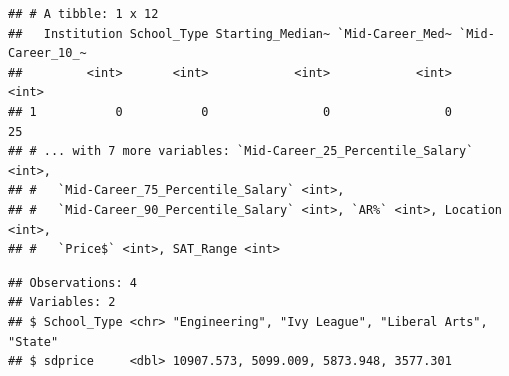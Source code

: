 \documentclass[]{article}
\newenvironment{Shaded}{\begin{snugshade}}{\end{snugshade}}
\newcommand{\KeywordTok}[1]{\textcolor[rgb]{0.13,0.29,0.53}{\textbf{#1}}}
\newcommand{\DataTypeTok}[1]{\textcolor[rgb]{0.13,0.29,0.53}{#1}}
\newcommand{\StringTok}[1]{\textcolor[rgb]{0.31,0.60,0.02}{#1}}
\newcommand{\ControlFlowTok}[1]{\textcolor[rgb]{0.13,0.29,0.53}{\textbf{#1}}}
\newcommand{\OperatorTok}[1]{\textcolor[rgb]{0.81,0.36,0.00}{\textbf{#1}}}
\newcommand{\NormalTok}[1]{#1}
\begin{document}
\begin{Shaded}
\end{Shaded}

\begin{verbatim}
## # A tibble: 1 x 12
##   Institution School_Type Starting_Median~ `Mid-Career_Med~ `Mid-Career_10_~
##         <int>       <int>            <int>            <int>            <int>
## 1           0           0                0                0               25
## # ... with 7 more variables: `Mid-Career_25_Percentile_Salary` <int>,
## #   `Mid-Career_75_Percentile_Salary` <int>,
## #   `Mid-Career_90_Percentile_Salary` <int>, `AR%` <int>, Location <int>,
## #   `Price$` <int>, SAT_Range <int>
\end{verbatim}

\begin{Shaded}
\end{Shaded}

\begin{verbatim}
## Observations: 4
## Variables: 2
## $ School_Type <chr> "Engineering", "Ivy League", "Liberal Arts", "State"
## $ sdprice     <dbl> 10907.573, 5099.009, 5873.948, 3577.301
\end{verbatim}
\end{document}
